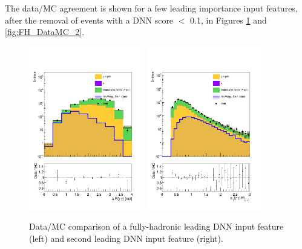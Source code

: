The data/MC agreement is shown for a few leading importance input features, after the removal of events with a DNN score $<$ 0.1, in Figures \ref{fig:FH_DataMC_1} and \ref{fig:FH_DataMC_2}. 

\begin{figure}[!htbp]
  \centering
  \includegraphics[width=0.45\textwidth]{Sections/HHWWgg/images/FH_DNN/DataMC/DataMC_New_DR_gg_SB_log.pdf}%
  \includegraphics[width=0.45\textwidth]{Sections/HHWWgg/images/FH_DNN/DataMC/DataMC_Scaled_Leading_Photon_pt_SB_log.pdf}%
  \caption{Data/MC comparison of a fully-hadronic leading DNN input feature (left) and second leading DNN input feature (right).}
\label{fig:FH_DataMC_1}
\end{figure}

